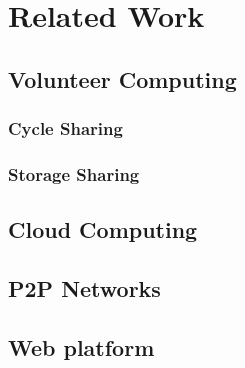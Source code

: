 % 
% 

\section{Related Work}


\subsection{Volunteer Computing}

\subsubsection{Cycle Sharing}

\subsubsection{Storage Sharing}


\subsection{Cloud Computing}


\subsection{P2P Networks}
 

\subsection{Web platform} 








